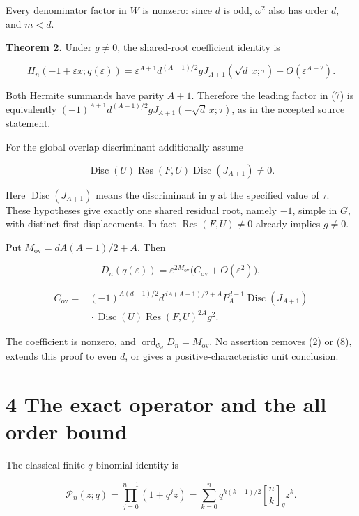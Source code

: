 \documentclass[
  11pt,
]{article}
\begin{document}
Every denominator factor in \(W\) is nonzero: since \(d\) is odd,
\(\omega^2\) also has order \(d\), and \(m<d\).

\textbf{Theorem 2.} Under \(g\ne 0\), the shared-root coefficient
identity is

\[
H_n(-1+\varepsilon x;q(\varepsilon))
=\varepsilon^{A+1}d^{(A-1)/2}g
J_{A+1}(\sqrt d\,x;\tau)+O(\varepsilon^{A+2}). \tag{7}
\]

Both Hermite summands have parity \(A+1\). Therefore the leading factor
in (7) is equivalently
\((-1)^{A+1}d^{(A-1)/2}gJ_{A+1}(-\sqrt d\,x;\tau)\), as in the accepted
source statement.

For the global overlap discriminant additionally assume

\[
\operatorname{Disc}(U)\operatorname{Res}(F,U)
\operatorname{Disc}(J_{A+1})\ne 0. \tag{8}
\]

Here \(\operatorname{Disc}(J_{A+1})\) means the discriminant in \(y\) at
the specified value of \(\tau\). These hypotheses give exactly one
shared residual root, namely \(-1\), simple in \(G\), with distinct
first displacements. In fact \(\operatorname{Res}(F,U)\ne0\) already
implies \(g\ne0\).

Put \(M_{\mathrm{ov}}=dA(A-1)/2+A\). Then

\[
D_n(q(\varepsilon))=
\varepsilon^{2M_{\mathrm{ov}}}
\bigl(C_{\mathrm{ov}}+O(\varepsilon^2)\bigr), \tag{9}
\]

\[
\begin{aligned}
C_{\mathrm{ov}}={}&(-1)^{A(d-1)/2}
 d^{dA(A+1)/2+A}P_A^{d-1}\operatorname{Disc}(J_{A+1})\\
&\mathrel{}\cdot\operatorname{Disc}(U)
\operatorname{Res}(F,U)^{2A}g^2.
\end{aligned} \tag{10}
\]

The coefficient is nonzero, and
\(\operatorname{ord}_{\Phi_d}D_n=M_{\mathrm{ov}}\). No assertion removes
(2) or (8), extends this proof to even \(d\), or gives a
positive-characteristic unit conclusion.

\section{4 The exact operator and the all order
bound}\label{the-exact-operator-and-the-all-order-bound}

The classical finite \(q\)-binomial identity is

\[
\mathcal P_n(z;q)=\prod_{j=0}^{n-1}(1+q^jz)
=\sum_{k=0}^{n}q^{k(k-1)/2}\genfrac{[}{]}{0pt}{}{n}{k}_qz^k. \tag{11}
\]
\end{document}
